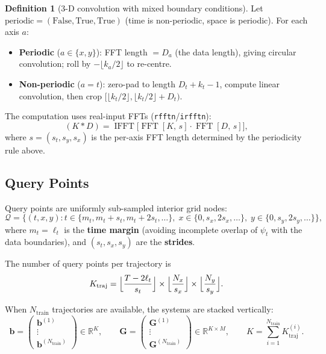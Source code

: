 \documentclass[11pt, letterpaper]{article}
\theoremstyle{definition}
\newtheorem{definition}{Definition}[section]
\newcommand{\R}{\mathbb{R}}
\newcommand{\vb}{\mathbf{b}}
\newcommand{\vG}{\mathbf{G}}
\DeclareMathOperator{\fftn}{FFT}
\DeclareMathOperator{\ifftn}{IFFT}
\begin{document}
\begin{definition}[3-D convolution with mixed boundary conditions]
\label{def:conv3d}
Let $\text{periodic} = (\text{False}, \text{True}, \text{True})$
(time is non-periodic, space is periodic).  For each axis $a$:
\begin{itemize}[nosep]
  \item \textbf{Periodic} ($a \in \{x, y\}$): FFT length $= D_a$
    (the data length), giving circular convolution;
    roll by $-\lfloor k_a/2 \rfloor$ to re-centre.
  \item \textbf{Non-periodic} ($a = t$): zero-pad to length
    $D_t + k_t - 1$, compute linear convolution, then crop
    $[\lfloor k_t/2\rfloor, \lfloor k_t/2\rfloor + D_t)$.
\end{itemize}
The computation uses real-input FFTs (\texttt{rfftn}/\texttt{irfftn}):
\begin{equation}
\label{eq:fft-conv}
  (K * D) = \ifftn\!\bigl[\fftn[K,\, s] \cdot \fftn[D,\, s]\bigr],
\end{equation}
where $s = (s_t, s_y, s_x)$ is the per-axis FFT length determined by the periodicity rule above.
\end{definition}

\subsection{Query Points}
\label{sec:query-points}

Query points are uniformly sub-sampled interior grid nodes:
\begin{equation}
\label{eq:query-points}
  \mathcal{Q} = \bigl\{
    (t, x, y) :
    t \in \{m_t, m_t+s_t, m_t+2s_t, \dots\},\;
    x \in \{0, s_x, 2s_x, \dots\},\;
    y \in \{0, s_y, 2s_y, \dots\}
  \bigr\},
\end{equation}
where $m_t = \ell_t$ is the \textbf{time margin} (avoiding incomplete
overlap of $\psi_t$ with the data boundaries), and
$(s_t, s_x, s_y)$ are the \textbf{strides}.

The number of query points per trajectory is
\begin{equation}
\label{eq:K-per-traj}
  K_{\mathrm{traj}}
  = \Bigl\lfloor\frac{T - 2\ell_t}{s_t}\Bigr\rfloor
  \times \Bigl\lfloor\frac{N_x}{s_x}\Bigr\rfloor
  \times \Bigl\lfloor\frac{N_y}{s_y}\Bigr\rfloor.
\end{equation}

When $N_{\mathrm{train}}$ trajectories are available, the systems are
stacked vertically:
\begin{equation}
  \vb = \begin{pmatrix} \vb^{(1)} \\ \vdots \\ \vb^{(N_{\mathrm{train}})} \end{pmatrix}
  \in \R^{K}, \qquad
  \vG = \begin{pmatrix} \vG^{(1)} \\ \vdots \\ \vG^{(N_{\mathrm{train}})} \end{pmatrix}
  \in \R^{K \times M},
  \qquad K = \sum_{i=1}^{N_{\mathrm{train}}} K_{\mathrm{traj}}^{(i)}.
\end{equation}
\end{document}

